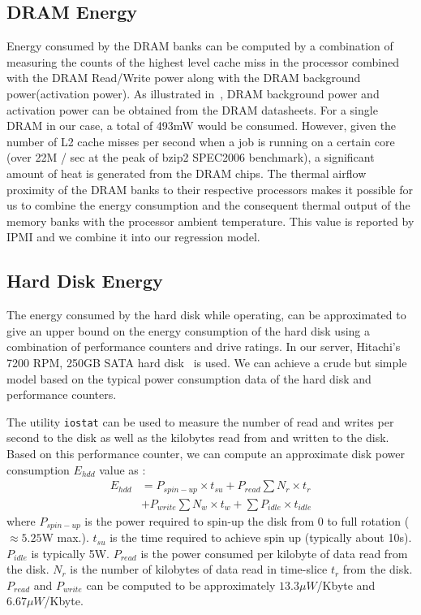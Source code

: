 \documentclass[times, 10pt, finalversion]{usetex-v1}
\begin{document}
\subsection{DRAM Energy}
\label{sec:dram}
Energy consumed by the DRAM banks can be computed by a combination of
measuring the counts of the highest level cache miss in the processor
combined with the DRAM Read/Write power along with the DRAM background
power(activation power).  As illustrated in~\cite{Micron2007}, DRAM
background power and activation power can be obtained from the DRAM
datasheets.  For a single DRAM in our case, a total of 493mW would be
consumed. However, given the number of L2 cache misses per second when a
job is running on a certain core (over 22M / sec at the peak of bzip2
SPEC2006 benchmark), a significant amount of heat is generated from the
DRAM chips. The thermal airflow proximity of the DRAM banks to their
respective processors makes it possible for us to combine the energy
consumption and the consequent thermal output of the memory banks with the
processor ambient temperature. This value is reported by IPMI and we
combine it into our regression model.
\subsection{Hard Disk Energy}
\label{sec:hddenergy}
The energy consumed by the hard disk while operating, can be
approximated to give an upper bound on the energy consumption of the
hard disk using a combination of performance counters and drive ratings.
In our server, Hitachi's 7200 RPM, 250GB SATA hard disk~
\cite{Hitachi2006} is used.  We can achieve a crude but simple model
based on the typical power consumption data of the hard disk and
performance counters.

The utility \texttt{iostat} can be used to measure the number of read
and writes per second to the disk as well as the kilobytes read from and
written to the disk. Based on this performance counter, we can
compute an approximate disk power consumption $E_{hdd}$ value as :
\begin{align}
\label{eqn:hddpwr1}
E_{hdd}& = P_{spin-up}\times t_{su}  +  P_{read}\sum N_r\times t_r  \nonumber \\
& + P_{write}\sum N_w\times t_w + \sum P_{idle}\times t_{idle}
\end{align}
where $P_{spin-up}$ is the power required to spin-up the disk from 0 to
full rotation ($\approx 5.25$W max.). $t_{su}$ is the time required to
achieve spin up (typically about 10s). $P_{idle}$ is typically
5W. $P_{read}$ is the power consumed per kilobyte of data read from the
disk. $N_r$ is the number of kilobytes of data read in time-slice $t_r$
from the disk. $P_{read}$ and $P_{write}$ can be computed to be
approximately $13.3 \mu W$/Kbyte and $6.67 \mu W$/Kbyte.
\end{document}
